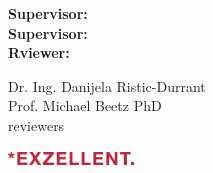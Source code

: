 \begin{titlepage}
\vfill

\begin{minipage}{0.2\linewidth}
\begin{flushleft}
\small \textbf{Supervisor:} \\
\small \textbf{Supervisor:} \\
\small \textbf{Rviewer:} \\
\end{flushleft}
\end{minipage}
\hfill
\begin{minipage}{0.7\linewidth}
\begin{flushleft}
\small Dr. Ing. Danijela Ristic-Durrant \\
\small Prof. Michael Beetz PhD \\
\small  reviewers\\
\end{flushleft}
\end{minipage}

\vspace{1.2cm}

\begin{flushleft}
\includegraphics[width=0.25\textwidth]{bilder/EXZELLENT_logo.png}
\end{flushleft}

\vspace{1cm}

\newpage

\end{titlepage}

